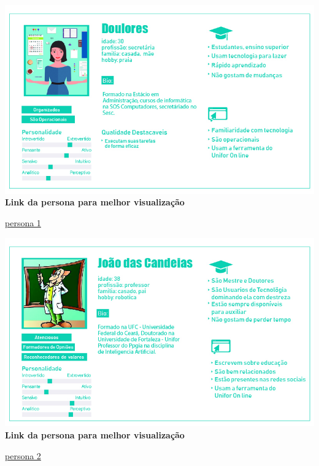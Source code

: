 \begin{center}

  \includegraphics[scale=0.5]{imagens/persona.jpg}\\

  \textbf{Link da persona para melhor visualização}

  \href{https://goo.gl/Fv4L6r}{persona 1}

\end{center}

\begin{center}

  \includegraphics[scale=0.5]{imagens/persona2.jpg}\\

  \textbf{Link da persona para melhor visualização}

  \href{https://goo.gl/rTJupp}{persona 2}

\end{center}
